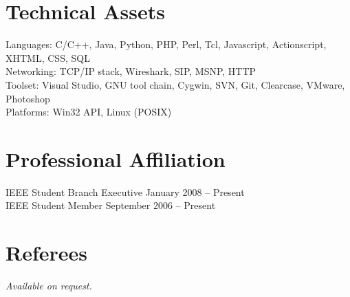 \documentclass[margin,line]{resume}
\begin{document}
\begin{resume}
    \section{\mysidestyle Technical Assets}
    Languages: C/C++, Java, Python, PHP, Perl, Tcl, Javascript, Actionscript, XHTML, CSS, SQL \vspace{1mm}\\
    Networking: TCP/IP stack, Wireshark, SIP, MSNP, HTTP
        \vspace{1mm}\\
    Toolset: Visual Studio, GNU tool chain, Cygwin, SVN, Git, Clearcase, VMware, Photoshop
        \vspace{1mm}\\
    Platforms: Win32 API, Linux (POSIX)

    \section{\mysidestyle Professional Affiliation}
    IEEE Student Branch Executive \hfill January 2008 -- Present\vspace{1mm}\\
    IEEE Student Member \hfill September 2006 -- Present

    \section{\mysidestyle Referees} 
    {\sl Available on request.}




\end{resume}
\end{document}
